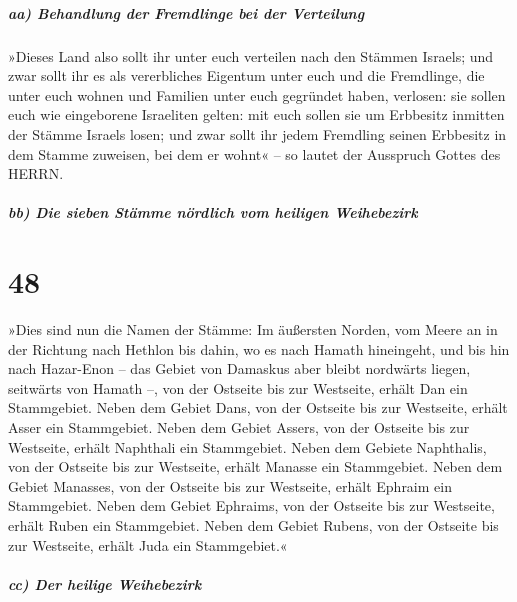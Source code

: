 \hypertarget{aa-behandlung-der-fremdlinge-bei-der-verteilung}{%
\subparagraph{aa) Behandlung der Fremdlinge bei der
Verteilung}\label{aa-behandlung-der-fremdlinge-bei-der-verteilung}}

»Dieses Land also sollt ihr unter euch verteilen nach den
Stämmen Israels; und zwar sollt ihr es als vererbliches
Eigentum unter euch und die Fremdlinge, die unter euch wohnen und
Familien unter euch gegründet haben, verlosen: sie sollen euch wie
eingeborene Israeliten gelten: mit euch sollen sie um Erbbesitz inmitten
der Stämme Israels losen; und zwar sollt ihr jedem
Fremdling seinen Erbbesitz in dem Stamme zuweisen, bei dem er wohnt« --
so lautet der Ausspruch Gottes des HERRN.

\hypertarget{bb-die-sieben-stuxe4mme-nuxf6rdlich-vom-heiligen-weihebezirk}{%
\subparagraph{bb) Die sieben Stämme nördlich vom heiligen
Weihebezirk}\label{bb-die-sieben-stuxe4mme-nuxf6rdlich-vom-heiligen-weihebezirk}}

\hypertarget{section-47}{%
\section{48}\label{section-47}}

»Dies sind nun die Namen der Stämme: Im äußersten Norden,
vom Meere an in der Richtung nach Hethlon bis dahin, wo es nach Hamath
hineingeht, und bis hin nach Hazar-Enon -- das Gebiet von Damaskus aber
bleibt nordwärts liegen, seitwärts von Hamath --, von der Ostseite bis
zur Westseite, erhält Dan ein Stammgebiet. Neben dem
Gebiet Dans, von der Ostseite bis zur Westseite, erhält Asser ein
Stammgebiet. Neben dem Gebiet Assers, von der Ostseite bis
zur Westseite, erhält Naphthali ein Stammgebiet. Neben dem
Gebiete Naphthalis, von der Ostseite bis zur Westseite, erhält Manasse
ein Stammgebiet. Neben dem Gebiet Manasses, von der
Ostseite bis zur Westseite, erhält Ephraim ein Stammgebiet.
Neben dem Gebiet Ephraims, von der Ostseite bis zur
Westseite, erhält Ruben ein Stammgebiet. Neben dem Gebiet
Rubens, von der Ostseite bis zur Westseite, erhält Juda ein
Stammgebiet.«

\hypertarget{cc-der-heilige-weihebezirk}{%
\subparagraph{cc) Der heilige
Weihebezirk}\label{cc-der-heilige-weihebezirk}}

